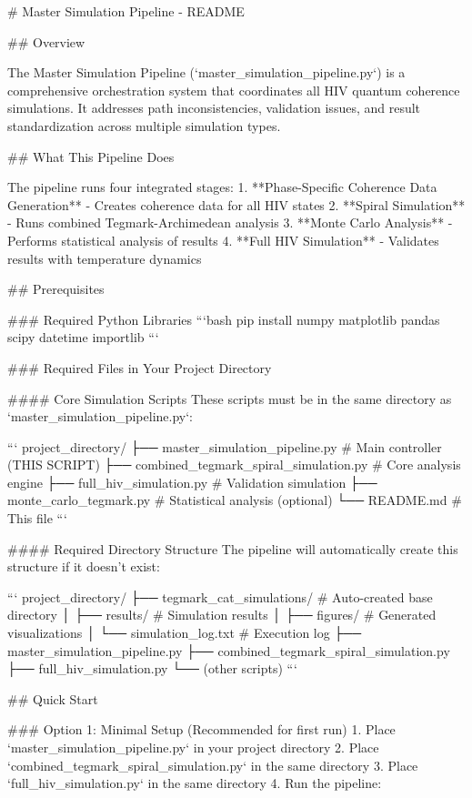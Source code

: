# Master Simulation Pipeline - README

## Overview

The Master Simulation Pipeline (`master_simulation_pipeline.py`) is a comprehensive orchestration system that coordinates all HIV quantum coherence simulations. It addresses path inconsistencies, validation issues, and result standardization across multiple simulation types.

## What This Pipeline Does

The pipeline runs four integrated stages:
1. **Phase-Specific Coherence Data Generation** - Creates coherence data for all HIV states
2. **Spiral Simulation** - Runs combined Tegmark-Archimedean analysis
3. **Monte Carlo Analysis** - Performs statistical analysis of results
4. **Full HIV Simulation** - Validates results with temperature dynamics

## Prerequisites

### Required Python Libraries
```bash
pip install numpy matplotlib pandas scipy datetime importlib
```

### Required Files in Your Project Directory

#### Core Simulation Scripts
These scripts must be in the same directory as `master_simulation_pipeline.py`:

```
project_directory/
├── master_simulation_pipeline.py          # Main controller (THIS SCRIPT)
├── combined_tegmark_spiral_simulation.py  # Core analysis engine
├── full_hiv_simulation.py                 # Validation simulation
├── monte_carlo_tegmark.py                 # Statistical analysis (optional)
└── README.md                             # This file
```

#### Required Directory Structure
The pipeline will automatically create this structure if it doesn't exist:

```
project_directory/
├── tegmark_cat_simulations/              # Auto-created base directory
│   ├── results/                          # Simulation results
│   ├── figures/                          # Generated visualizations
│   └── simulation_log.txt                # Execution log
├── master_simulation_pipeline.py
├── combined_tegmark_spiral_simulation.py
├── full_hiv_simulation.py
└── (other scripts)
```

## Quick Start

### Option 1: Minimal Setup (Recommended for first run)
1. Place `master_simulation_pipeline.py` in your project directory
2. Place `combined_tegmark_spiral_simulation.py` in the same directory
3. Place `full_hiv_simulation.py` in the same directory
4. Run the pipeline:

